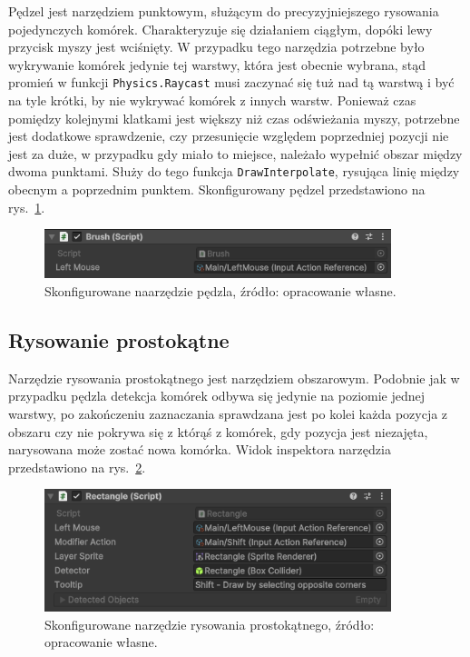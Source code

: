 Pędzel jest narzędziem punktowym, służącym do precyzyjniejszego rysowania pojedynczych komórek.
Charakteryzuje się działaniem ciągłym, dopóki lewy przycisk myszy jest wciśnięty.
W przypadku tego narzędzia potrzebne było wykrywanie komórek jedynie tej warstwy, która jest obecnie wybrana,
stąd promień w funkcji \texttt{Physics.Raycast} musi zaczynać się tuż nad tą warstwą
i być na tyle krótki, by nie wykrywać komórek z innych warstw.
Ponieważ czas pomiędzy kolejnymi klatkami jest większy niż czas odświeżania myszy,
potrzebne jest dodatkowe sprawdzenie, czy przesunięcie względem poprzedniej pozycji nie jest za duże,
w przypadku gdy miało to miejsce, należało wypełnić obszar między dwoma punktami.
Służy do tego funkcja \texttt{DrawInterpolate},
rysująca linię między obecnym a poprzednim punktem.
Skonfigurowany pędzel przedstawiono na rys.~\ref{fig:brush}.

\begin{figure}[h!]
    \centering
    \includegraphics[width=0.9\textwidth]{chapters/chapter4/rys/tools/brush}
    \caption[Skonfigurowane narzędzie pędzla.]{Skonfigurowane naarzędzie pędzla, źródło: opracowanie własne.}
    \label{fig:brush}
\end{figure}
%

\subsection{Rysowanie prostokątne}
\label{subsec:rysowanie_prostokatne}

Narzędzie rysowania prostokątnego jest narzędziem obszarowym.
Podobnie jak w przypadku pędzla detekcja komórek odbywa się jedynie na poziomie jednej warstwy,
po zakończeniu zaznaczania sprawdzana jest po kolei każda pozycja z obszaru czy nie pokrywa się z którąś z komórek,
gdy pozycja jest niezajęta, narysowana może zostać nowa komórka.
Widok inspektora narzędzia przedstawiono na rys.~\ref{fig:rectangle}.

\begin{figure}[h!]
    \centering
    \includegraphics[width=0.9\textwidth]{chapters/chapter4/rys/tools/rectangle}
    \caption[Skonfigurowane narzędzie rysowania prostokątnego.]{Skonfigurowane narzędzie rysowania prostokątnego, źródło: opracowanie własne.}
    \label{fig:rectangle}
\end{figure}

